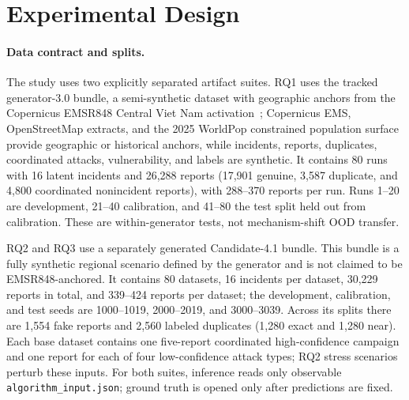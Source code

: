 \documentclass[runningheads]{llncs}
\newcounter{algline}%
\newenvironment{algorithmic}[1][1]{%
    \setcounter{algline}{0}%
    \begin{list}{}{\setlength{\leftmargin}{3.2em}\setlength{\labelwidth}{2.4em}%
      \setlength{\labelsep}{0.6em}\setlength{\itemsep}{0.15ex}\setlength{\parsep}{0pt}%
      \setlength{\topsep}{0.2ex}}\small\normalfont}{\end{list}}%
\newcommand{\algitem}{\stepcounter{algline}%
    \item[{\makebox[2.4em][r]{\thealgline:}}]}%
\newcommand{\State}{\algitem}%
\newcommand{\Function}[2]{\algitem\textbf{function}~\textproc{##1}(##2)}%
\newcommand{\EndFunction}{\algitem\textbf{end function}}%
\newcommand{\Return}{\textbf{return}~}%
\providecommand{\textproc}[1]{\textsc{##1}}%
\begin{document}
\Needspace*{0.36\textheight}

\section{Experimental Design}

\paragraph{Data contract and splits.}
The study uses two explicitly separated artifact suites. RQ1 uses the tracked
generator-3.0 bundle, a semi-synthetic dataset with geographic anchors from
the Copernicus EMSR848 Central Viet Nam activation~\cite{copernicusEMSR848};
Copernicus EMS, OpenStreetMap extracts, and the 2025 WorldPop constrained
population surface~\cite{worldpop2025vietnam} provide geographic or historical anchors, while
incidents, reports, duplicates, coordinated attacks, vulnerability, and
labels are synthetic. It contains 80 runs with 16 latent incidents and
26,288 reports (17,901 genuine, 3,587 duplicate, and 4,800 coordinated
nonincident reports), with 288--370 reports per run. Runs 1--20 are
development, 21--40 calibration, and 41--80 the test split held out from
calibration. These are within-generator tests, not mechanism-shift OOD
transfer.

RQ2 and RQ3 use a separately generated Candidate-4.1 bundle. This bundle is
a fully synthetic regional scenario defined by the generator and is not
claimed to be EMSR848-anchored. It contains 80 datasets, 16 incidents per
dataset, 30,229 reports in total, and 339--424 reports per dataset; the
development, calibration, and test seeds are 1000--1019, 2000--2019, and
3000--3039. Across its splits there are 1,554 fake reports and 2,560 labeled
duplicates (1,280 exact and 1,280 near). Each base dataset contains one
five-report coordinated high-confidence campaign and one report for each of
four low-confidence attack types; RQ2 stress scenarios perturb these inputs.
For both suites, inference reads only observable
\texttt{algorithm\_input.json}; ground truth is opened only after predictions
are fixed.
\end{document}

